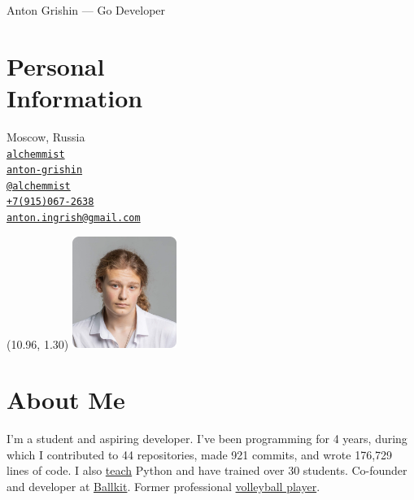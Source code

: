 \documentclass[margin,line]{resume}
\begin{document}
{\vspace*{-13mm}\sc \large Anton Grishin — Go Developer} \\
\begin{resume}
  \begin{minipage}[t]{0.55\textwidth}
    \section{\mysidestyle Personal\\Information}
    Moscow, Russia \\
    \faGithub  \space
    \href{https://github.com/alchemmist/}{\texttt{alchemmist}} \\
    \faLinkedin \space
    \href{https://www.linkedin.com/in/anton-grishin-6966a8362/}{\texttt{anton-grishin}}
    \\
    \faPaperPlane \space \href{https://t.me/alchemmist}{\texttt{@alchemmist}} \\
    \faPhone \space
    \href{tel:+1234567890}{\color{blue}\texttt{+7(915)067-2638}}  \\
    \faEnvelope \space
    \href{mailto:anton.ingrish@gmail.com}{\color{blue}\texttt{anton.ingrish@gmail.com}}
  \end{minipage}

  \begin{minipage}[H]{0.18\textwidth}
    \begin{textblock}{7}(10.96, 1.30)
      \includegraphics[width=0.255\textwidth]{../images/avatar.png}
    \end{textblock}
  \end{minipage}

  \vspace{-7mm}
  \section{\mysidestyle About Me}
  I'm a student and aspiring developer. I've been programming for 4 years, during which I contributed to 44 repositories, made 921 commits, and wrote 176,729 lines of code.
  I also \href{https://www.avito.ru/moskva/predlozheniya_uslug/prepodavatel_programmirovaniya_na_python_2556461612}{teach} Python and have trained over 30 students. Co-founder and developer at \href{https://ballkit.ru/}{Ballkit}. Former professional \href{https://alchemmist.github.io/CV/attachments/sport.pdf}{volleyball player}.


\end{resume}
\end{document}
